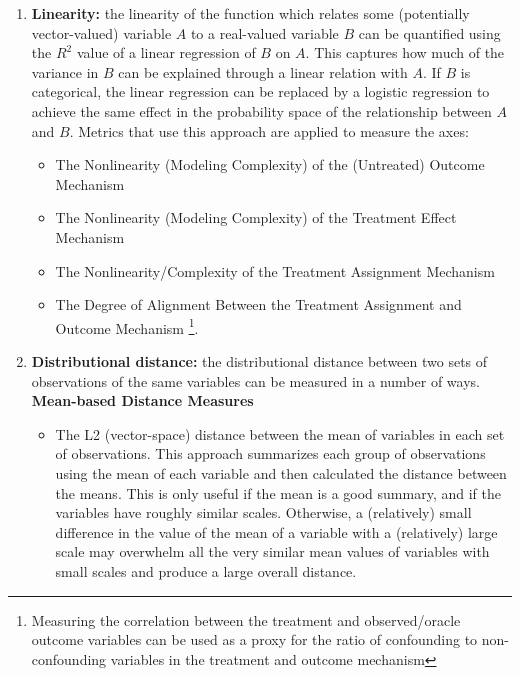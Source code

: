 \documentclass[../main.tex]{subfiles}
\begin{document}
\begin{enumerate}
    \item \textbf{Linearity:} the linearity of the function which relates some (potentially vector-valued) variable $A$ to a real-valued variable $B$ can be quantified using the $R^2$ value of a linear regression of $B$ on $A$. This captures how much of the variance in $B$ can be explained through a linear relation with $A$. If $B$ is categorical, the linear regression can be replaced by a logistic regression to achieve the same effect in the probability space of the relationship between $A$ and $B$. Metrics that use this approach are applied to measure the axes:

    \begin{itemize}
        \item The Nonlinearity (Modeling Complexity) of the (Untreated) Outcome Mechanism
        \item The Nonlinearity (Modeling Complexity) of the Treatment Effect Mechanism
        \item The Nonlinearity/Complexity of the Treatment Assignment Mechanism
        \item The Degree of Alignment Between the Treatment Assignment and Outcome Mechanism \footnote{Measuring the correlation between the treatment and observed/oracle outcome variables can be used as a proxy for the ratio of confounding to non-confounding variables in the treatment and outcome mechanism}.
    \end{itemize}

    \item \textbf{Distributional distance:} the distributional distance between two sets of observations of the same variables can be measured in a number of ways.
    \vspace{\baselineskip}
    \textbf{Mean-based Distance Measures}

    \begin{itemize}

        \item The L2 (vector-space) distance between the mean of variables in each set of observations. This approach summarizes each group of observations using the mean of each variable and then calculated the distance between the means. This is only useful if the mean is a good summary, and if the variables have roughly similar scales. Otherwise, a (relatively) small difference in the value of the mean of a variable with a (relatively) large scale may overwhelm all the very similar mean values of variables with small scales and produce a large overall distance.


\end{itemize}
\end{enumerate}
\end{document}
